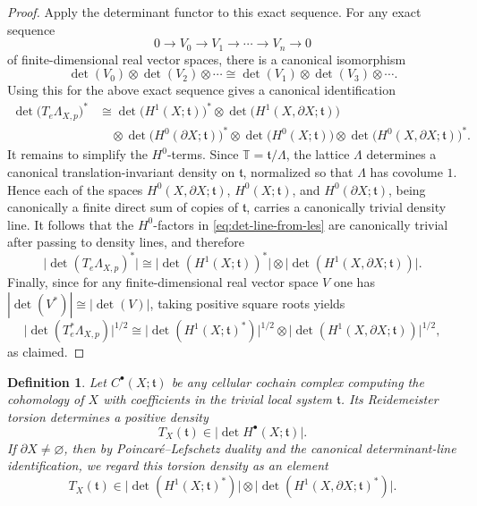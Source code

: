\documentclass[12pt]{amsart}
\numberwithin{equation}{section}
\newtheorem{definition}[theorem]{Definition}
\begin{document}
\begin{proof}
Apply the determinant functor to this exact sequence. For any exact sequence
\[
0\to V_0\to V_1\to \cdots \to V_n\to 0
\]
of finite-dimensional real vector spaces, there is a canonical isomorphism
\[
\det(V_0)\otimes \det(V_2)\otimes \cdots
\cong
\det(V_1)\otimes \det(V_3)\otimes \cdots.
\]
Using this for the above exact sequence gives a canonical identification
\begin{equation}\label{eq:det-line-from-les}
\begin{aligned}
\det\bigl(T_e\Lambda_{X,p}\bigr)^*
&\cong
\det\bigl(H^1(X;\mathfrak t)\bigr)^*
\otimes
\det\bigl(H^1(X,\partial X;\mathfrak t)\bigr) \\
&\quad \otimes
\det\bigl(H^0(\partial X;\mathfrak t)\bigr)^*
\otimes
\det\bigl(H^0(X;\mathfrak t)\bigr)
\otimes
\det\bigl(H^0(X,\partial X;\mathfrak t)\bigr)^*.
\end{aligned}
\end{equation}
It remains to simplify the \(H^{0}\)-terms. Since \(\mathbb T= \mathfrak t/\Lambda\), the lattice \(\Lambda\) determines a canonical translation-invariant density on \(\mathfrak t\), normalized so that \(\Lambda\) has covolume \(1\). Hence each of the spaces \(H^{0}(X,\partial X;\mathfrak t)\), \(H^{0}(X;\mathfrak t)\), and \(H^{0}(\partial X;\mathfrak t)\), being canonically a finite direct sum of copies of \(\mathfrak t\), carries a canonically trivial density line. It follows that the \(H^{0}\)-factors in \eqref{eq:det-line-from-les} are canonically trivial after passing to density lines, and therefore
\[
\bigl|\det(T_e\Lambda_{X,p})^*\bigr|
\cong
\bigl|\det(H^1(X;\mathfrak t))^*\bigr|
\otimes
\bigl|\det(H^1(X,\partial X;\mathfrak t))\bigr|.
\]
Finally, since for any finite-dimensional real vector space $V$ one has $|\det(V^*)|\cong |\det(V)|$,
taking positive square roots yields
\[
\bigl|\det(T_e^*\Lambda_{X,p})\bigr|^{1/2}
\cong
\bigl|\det(H^1(X;\mathfrak t)^*)\bigr|^{1/2}
\otimes
\bigl|\det(H^1(X,\partial X;\mathfrak t))\bigr|^{1/2},
\]
as claimed.
\end{proof}

\begin{definition}
\label{def:torsion-density}
Let $C^\bullet(X;\mathfrak t)$ be any cellular cochain complex computing the cohomology of $X$
with coefficients in the trivial local system $\mathfrak t$. Its Reidemeister torsion determines a positive
density
\[
T_X(\mathfrak t)\in \bigl|\det H^\bullet(X;\mathfrak t)\bigr|.
\]
If $\partial X\neq \varnothing$, then by Poincar\'e--Lefschetz duality and the canonical determinant-line
identification, we regard this torsion density as an element
\begin{equation}\label{eq:torsion-boundary-identification}
T_X(\mathfrak t)\in
\bigl|\det(H^1(X;\mathfrak t)^*)\bigr|
\otimes
\bigl|\det(H^1(X,\partial X;\mathfrak t)^*)\bigr|.
\end{equation}
\end{definition}
\end{document}
